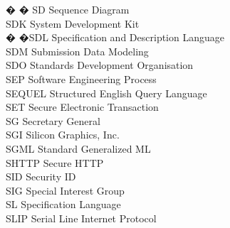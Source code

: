 \begin{tabbing}
� � \>SD \>\>Sequence Diagram\\

    \>SDK \>\>System Development Kit\\

 � �\>SDL \>\>Specification and Description Language\\


    \>SDM \>\>Submission Data Modeling\\

    \>SDO \>\>Standards Development Organisation\\


    \>SEP \>\>Software Engineering Process\\

    \>SEQUEL \>\>Structured English Query Language\\

    \>SET \>\>Secure Electronic Transaction\\

    \>SG \>\>Secretary General\\


    \>SGI \>\>Silicon Graphics, Inc.\\

    \>SGML \>\>Standard Generalized ML\\

    \>SHTTP \>\>Secure HTTP\\

    \>SID \>\>Security ID\\


    \>SIG \>\>Special Interest Group\\



    \>SL \>\>Specification Language\\

    \>SLIP \>\>Serial Line Internet Protocol\\


\end{tabbing}
